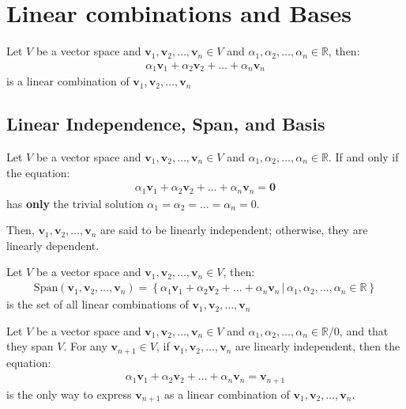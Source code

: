\documentclass[11pt]{report}
\begin{document}
\section{Linear combinations and Bases}
\begin{definition}
    Let $V$ be a vector space and $\textbf{v}_1, \textbf{v}_2, \ldots, \textbf{v}_n \in V$ and $\alpha_1, \alpha_2, \ldots, \alpha_n \in \mathbb{R}$, then:
    \begin{align*}
        \alpha_1 \textbf{v}_1 + \alpha_2 \textbf{v}_2 + \ldots + \alpha_n \textbf{v}_n
    \end{align*}
    is a linear combination of $\textbf{v}_1, \textbf{v}_2, \ldots, \textbf{v}_n$
\end{definition}
\subsection{Linear Independence, Span, and Basis}
\begin{definition}
    Let $V$ be a vector space and $\textbf{v}_1, \textbf{v}_2, \ldots, \textbf{v}_n \in V$ and $\alpha_1, \alpha_2, \ldots, \alpha_n \in \mathbb{R}$. If and only if the equation:
    \begin{align*}
        \alpha_1 \textbf{v}_1 + \alpha_2 \textbf{v}_2 + \ldots + \alpha_n \textbf{v}_n = \textbf{0}
    \end{align*}
    has \textbf{only} the trivial solution $\alpha_1 = \alpha_2 = \ldots = \alpha_n = 0$.

    Then, $\textbf{v}_1, \textbf{v}_2, \ldots, \textbf{v}_n$ are said to be linearly independent; otherwise, they are linearly dependent.
\end{definition}
\begin{definition}[Span]
    Let $V$ be a vector space and $\textbf{v}_1, \textbf{v}_2, \ldots, \textbf{v}_n \in V$, then:
    \begin{align}
        \text{Span}(\textbf{v}_1, \textbf{v}_2, \ldots, \textbf{v}_n) = \left\{ \alpha_1 \textbf{v}_1 + \alpha_2 \textbf{v}_2 + \ldots + \alpha_n \textbf{v}_n \, | \, \alpha_1, \alpha_2, \ldots, \alpha_n \in \mathbb{R} \right\}
    \end{align}
    is the set of all linear combinations of $\textbf{v}_1, \textbf{v}_2, \ldots, \textbf{v}_n$
\end{definition}
\begin{theorem}
    Let $V$ be a vector space and $\textbf{v}_1, \textbf{v}_2, \ldots, \textbf{v}_n \in V$ and $\alpha_1, \alpha_2, \ldots, \alpha_n \in \mathbb{R}/0$, and that they span $V$. For any $\textbf{v}_{n+1} \in V$, if $\textbf{v}_1, \textbf{v}_2, \ldots, \textbf{v}_n$ are linearly independent, then the equation:
    \begin{align*}
        \alpha_1 \textbf{v}_1 + \alpha_2 \textbf{v}_2 + \ldots + \alpha_n \textbf{v}_n = \textbf{v}_{n+1}  
    \end{align*} 
    is the only way to express $\textbf{v}_{n+1}$ as a linear combination of $\textbf{v}_1, \textbf{v}_2, \ldots, \textbf{v}_n$.
\end{theorem}
\end{document}

